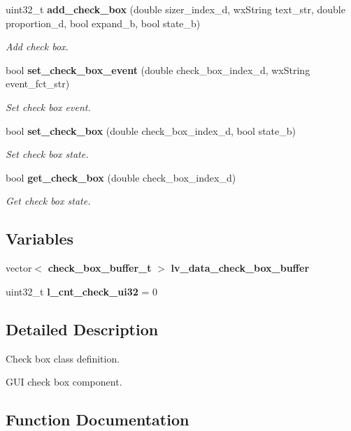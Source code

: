 \begin{DoxyCompactItemize}
uint32\+\_\+t \textbf{ add\+\_\+check\+\_\+box} (double sizer\+\_\+index\+\_\+d, wx\+String text\+\_\+str, double proportion\+\_\+d, bool expand\+\_\+b, bool state\+\_\+b)
\begin{DoxyCompactList}\small\item\em Add check box. \end{DoxyCompactList}\item 
bool \textbf{ set\+\_\+check\+\_\+box\+\_\+event} (double check\+\_\+box\+\_\+index\+\_\+d, wx\+String event\+\_\+fct\+\_\+str)
\begin{DoxyCompactList}\small\item\em Set check box event. \end{DoxyCompactList}\item 
bool \textbf{ set\+\_\+check\+\_\+box} (double check\+\_\+box\+\_\+index\+\_\+d, bool state\+\_\+b)
\begin{DoxyCompactList}\small\item\em Set check box state. \end{DoxyCompactList}\item 
bool \textbf{ get\+\_\+check\+\_\+box} (double check\+\_\+box\+\_\+index\+\_\+d)
\begin{DoxyCompactList}\small\item\em Get check box state. \end{DoxyCompactList}\end{DoxyCompactItemize}
\subsection*{Variables}
\begin{DoxyCompactItemize}
\item 
vector$<$ \textbf{ check\+\_\+box\+\_\+buffer\+\_\+t} $>$ \textbf{ lv\+\_\+data\+\_\+check\+\_\+box\+\_\+buffer}
\item 
\mbox{\label{group___check__box_gaaadd6b00911e90faea6e98b0f0bdad62}} 
uint32\+\_\+t {\bfseries l\+\_\+cnt\+\_\+check\+\_\+ui32} = 0
\end{DoxyCompactItemize}


\subsection{Detailed Description}
Check box class definition. 

G\+UI check box component.

\subsection{Function Documentation}
\mbox{\label{group___check__box_ga490542606fe12f142cd2b00cb1ecaefd}} 
